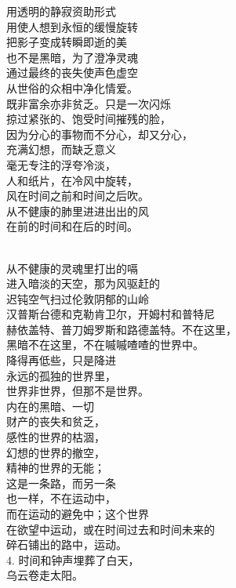 \documentclass{article}
\begin{document}
用透明的静寂资助形式\\
用使人想到永恒的缓慢旋转\\
把影子变成转瞬即逝的美\\
也不是黑暗，为了澄净灵魂\\
通过最终的丧失使声色虚空\\
从世俗的众相中净化情爱。\\
既非富余亦非贫乏。只是一次闪烁\\
掠过紧张的、饱受时间摧残的脸，\\
因为分心的事物而不分心，却又分心，\\
充满幻想，而缺乏意义\\
毫无专注的浮夸冷淡，\\
人和纸片，在冷风中旋转，\\
风在时间之前和时间之后吹。\\
从不健康的肺里进进出出的风\\
在前的时间和在后的时间。 \par \newpage  \par 
\\
从不健康的灵魂里打出的嗝\\
进入暗淡的天空，那为风驱赶的\\
迟钝空气扫过伦敦阴郁的山岭\\
汉普斯台德和克勒肯卫尔，开姆村和普特尼\\
赫依盖特、普刀姆罗斯和路德盖特。不在这里，\\
黑暗不在这里，不在嘁嘁喳喳的世界中。\\
降得再低些，只是降进\\
永远的孤独的世界里，\\
世界非世界，但那不是世界。\\
内在的黑暗、一切\\
财产的丧失和贫乏，\\
感性的世界的枯涸，\\
幻想的世界的撤空，\\
精神的世界的无能；\\
这是一条路，而另一条\\
也一样，不在运动中，\\
而在运动的避免中；这个世界\\
在欲望中运动，或在时间过去和时间未来的\\
碎石铺出的路中，运动。\\
4. 时间和钟声埋葬了白天，\\
乌云卷走太阳。 \par \newpage  \par 
\\
\end{document}
